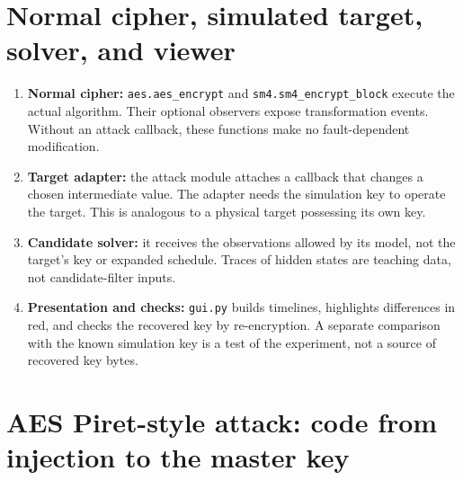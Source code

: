 \documentclass[11pt,a4paper]{report}
\begin{document}
\section{Normal cipher, simulated target, solver, and viewer}
\begin{enumerate}
\item \textbf{Normal cipher:} \texttt{aes.aes\_encrypt} and \texttt{sm4.sm4\_encrypt\_block} execute the actual algorithm. Their optional observers expose transformation events. Without an attack callback, these functions make no fault-dependent modification.
\item \textbf{Target adapter:} the attack module attaches a callback that changes a chosen intermediate value. The adapter needs the simulation key to operate the target. This is analogous to a physical target possessing its own key.
\item \textbf{Candidate solver:} it receives the observations allowed by its model, not the target's key or expanded schedule. Traces of hidden states are teaching data, not candidate-filter inputs.
\item \textbf{Presentation and checks:} \texttt{gui.py} builds timelines, highlights differences in red, and checks the recovered key by re-encryption. A separate comparison with the known simulation key is a test of the experiment, not a source of recovered key bytes.
\end{enumerate}
\begin{center}
\end{center}

\section{AES Piret-style attack: code from injection to the master key}
\end{document}
